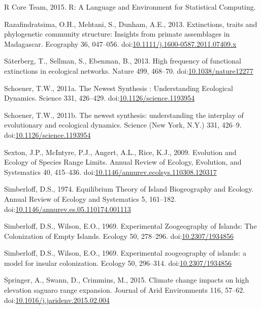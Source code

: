 \hypertarget{ref-Rcoreteam2015}{}
R Core Team, 2015. R: A Language and Environment for Statistical
Computing.

\hypertarget{ref-Razafindratsima2013}{}
Razafindratsima, O.H., Mehtani, S., Dunham, A.E., 2013. Extinctions,
traits and phylogenetic community structure: Insights from primate
assemblages in Madagascar. Ecography 36, 047--056.
doi:\href{https://doi.org/10.1111/j.1600-0587.2011.07409.x}{10.1111/j.1600-0587.2011.07409.x}

\hypertarget{ref-Saterberg2013}{}
Säterberg, T., Sellman, S., Ebenman, B., 2013. High frequency of
functional extinctions in ecological networks. Nature 499, 468--70.
doi:\href{https://doi.org/10.1038/nature12277}{10.1038/nature12277}

\hypertarget{ref-Schoener2011a}{}
Schoener, T.W., 2011a. The Newest Synthesis : Understanding Ecological
Dynamics. Science 331, 426--429.
doi:\href{https://doi.org/10.1126/science.1193954}{10.1126/science.1193954}

\hypertarget{ref-Schoener2011}{}
Schoener, T.W., 2011b. The newest synthesis: understanding the interplay
of evolutionary and ecological dynamics. Science (New York, N.Y.) 331,
426--9.
doi:\href{https://doi.org/10.1126/science.1193954}{10.1126/science.1193954}

\hypertarget{ref-Sexton2009}{}
Sexton, J.P., McIntyre, P.J., Angert, A.L., Rice, K.J., 2009. Evolution
and Ecology of Species Range Limits. Annual Review of Ecology,
Evolution, and Systematics 40, 415--436.
doi:\href{https://doi.org/10.1146/annurev.ecolsys.110308.120317}{10.1146/annurev.ecolsys.110308.120317}

\hypertarget{ref-Simberloff1974a}{}
Simberloff, D.S., 1974. Equilibrium Theory of Island Biogeography and
Ecology. Annual Review of Ecology and Systematics 5, 161--182.
doi:\href{https://doi.org/10.1146/annurev.es.05.110174.001113}{10.1146/annurev.es.05.110174.001113}

\hypertarget{ref-Simberloff1969}{}
Simberloff, D.S., Wilson, E.O., 1969. Experimental Zoogeography of
Islands: The Colonization of Empty Islands. Ecology 50, 278--296.
doi:\href{https://doi.org/10.2307/1934856}{10.2307/1934856}

\hypertarget{ref-Simberloff1969a}{}
Simberloff, D.S., Wilson, E.O., 1969. Experimental zoogeography of
islands: a model for insular colonization. Ecology 50, 296--314.
doi:\href{https://doi.org/10.2307/1934856}{10.2307/1934856}

\hypertarget{ref-Springer2015}{}
Springer, A., Swann, D., Crimmins, M., 2015. Climate change impacts on
high elevation saguaro range expansion. Journal of Arid Environments
116, 57--62.
doi:\href{https://doi.org/10.1016/j.jaridenv.2015.02.004}{10.1016/j.jaridenv.2015.02.004}

